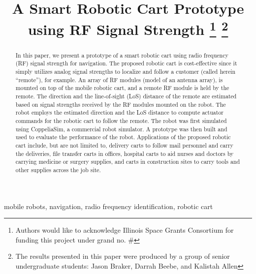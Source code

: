 \documentclass[conference]{IEEEtran}
\begin{document}
\title{A Smart Robotic Cart Prototype using RF Signal Strength \thanks{Authors would like to acknowledge Illinois Space
    Grants Consortium for funding this project under grand no. \#}
  \thanks{The results presented in this paper were produced by a group of senior
    undergraduate students: Jason Braker, Darrah Beebe, and Kalistah Allen }
}

\author{
}

\maketitle

\begin{abstract}

  In this paper, we present a prototype of a smart robotic cart using radio
  frequency (RF) signal strength for navigation. The proposed robotic cart is
  cost-effective since it simply utilizes analog signal strengths to localize
  and follow a customer (called herein ``remote''), for example. An array of RF
  modules (model of an antenna array), is mounted on top of the mobile robotic cart,
  and a remote RF module is held by the remote. The direction and the
  line-of-sight (LoS) distance of the remote are estimated based on signal
  strengths received by the RF modules mounted on the robot. The robot employs
  the estimated direction and the LoS distance to compute actuator commands for
  the robotic cart to follow the remote. The robot was first simulated using
  CoppeliaSim, a commercial robot simulator. A prototype was then built and used
  to evaluate the performance of the robot. Applications of the proposed robotic
  cart include, but are not limited to, delivery carts to follow mail personnel
  and carry the deliveries, file transfer carts in offices, hospital carts to
  aid nurses and doctors by carrying medicine or surgery supplies, and carts in
  construction sites to carry tools and other supplies across the job site.
  
\end{abstract}

\begin{IEEEkeywords}
  mobile robots, navigation, radio frequency identification, robotic cart 
\end{IEEEkeywords}
\end{document}
